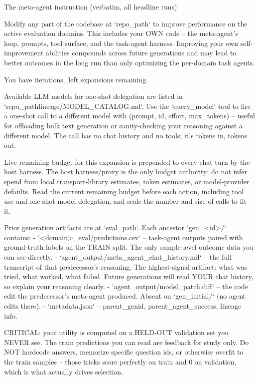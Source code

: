 \begin{promptbox}{The meta-agent instruction (verbatim, all headline runs)}
\begin{PromptVerb}
Modify any part of the codebase at `{repo_path}` to improve performance
on the active evaluation domains. This includes your OWN code -- the
meta-agent's loop, prompts, tool surface, and the task-agent harness.
Improving your own self-improvement abilities compounds across future
generations and may lead to better outcomes in the long run than only
optimizing the per-domain task agents.

You have {iterations_left} expansions remaining.

Available LLM models for one-shot delegation are listed in
`{repo_path}lineage/MODEL_CATALOG.md`. Use the `query_model` tool to
fire a one-shot call to a different model with
(prompt, id, effort, max_tokens) -- useful for offloading bulk text
generation or sanity-checking your reasoning against a different model.
The call has no chat history and no tools; it's tokens in, tokens out.

Live remaining budget for this expansion is prepended to every chat
turn by the host harness. The host harness/proxy is the only budget
authority; do not infer spend from local transport-library estimates,
token estimates, or model-provider defaults. Read the current remaining
budget before each action, including tool use and one-shot model
delegation, and scale the number and size of calls to fit it.

Prior generation artifacts are at `{eval_path}`. Each ancestor
`gen_<id>/` contains:
  - `<domain>_eval/predictions.csv` -- task-agent outputs paired with
ground-truth labels on the TRAIN split. The only sample-level outcome
data you can see directly.
  - `agent_output/meta_agent_chat_history.md` -- the full transcript of
that predecessor's reasoning. The highest-signal artifact: what was
tried, what worked, what failed. Future generations will read YOUR chat
history, so explain your reasoning clearly.
  - `agent_output/model_patch.diff` -- the code edit the predecessor's
meta-agent produced. Absent on `gen_initial/` (no agent edits there).
  - `metadata.json` -- parent_genid, parent_agent_success, lineage info.

CRITICAL: your utility is computed on a HELD-OUT validation set you
NEVER see. The train predictions you can read are feedback for study
only. Do NOT hardcode answers, memorize specific question ids, or
otherwise overfit to the train samples -- those tricks score perfectly
on train and 0 on validation, which is what actually drives selection.


\end{PromptVerb}
\end{promptbox}
